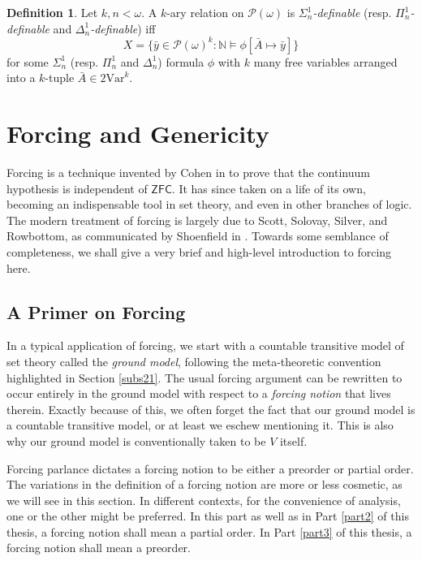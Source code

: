 \documentclass[12pt, twoside]{memoir}
\numberwithin{equation}{section}
\theoremstyle{definition}
\newtheorem{defi}[thm]{Definition}
\theoremstyle{remark}
\theoremstyle{definition}
\theoremstyle{definition}
\theoremstyle{definition}
\theoremstyle{remark}
\begin{document}
\begin{defi}
Let $k, n < \omega$. A $k$-ary relation on $\mathcal{P}(\omega)$ is $\Sigma^1_n$\emph{-definable} (resp. $\Pi^1_n$\emph{-definable} and $\Delta^1_n$\emph{-definable}) iff $$X = \{\bar{y} \in \mathcal{P}(\omega)^k : \mathbb{N} \models \phi[\bar{A} \mapsto \bar{y}]\}$$ for some $\Sigma^1_n$ (resp. $\Pi^1_n$ and $\Delta^1_n$) formula $\phi$ with $k$ many free variables arranged into a $k$-tuple $\bar{A} \in \mathrm{2Var}^k$.
\end{defi}

\chapter{Forcing and Genericity}\label{subs24}

Forcing is a technique invented by Cohen in \cite{cohen1} to prove that the continuum hypothesis is independent of $\mathsf{ZFC}$. It has since taken on a life of its own, becoming an indispensable tool in set theory, and even in other branches of logic. The modern treatment of forcing is largely due to Scott, Solovay, Silver, and Rowbottom, as communicated by Shoenfield in \cite{shoenfield}. Towards some semblance of completeness, we shall give a very brief and high-level introduction to forcing here.

\section{A Primer on Forcing}

In a typical application of forcing, we start with a countable transitive model of set theory called the \emph{ground model}, following the meta-theoretic convention highlighted in Section \ref{subs21}. The usual forcing argument can be rewritten to occur entirely in the ground model with respect to a \emph{forcing notion} that lives therein. Exactly because of this, we often forget the fact that our ground model is a countable transitive model, or at least we eschew mentioning it. This is also why our ground model is conventionally taken to be $V$ itself. 

Forcing parlance dictates a forcing notion to be either a preorder or partial order. The variations in the definition of a forcing notion are more or less cosmetic, as we will see in this section. In different contexts, for the convenience of analysis, one or the other might be preferred. In this part as well as in Part \ref{part2} of this thesis, a forcing notion shall mean a partial order. In Part \ref{part3} of this thesis, a forcing notion shall mean a preorder.
\end{document}
